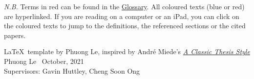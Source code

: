 \thispagestyle{empty}
\vspace*{5cm}
\Large
\textit{N.B.} Terms in red can be found in the \hyperref[glossary]{Glossary}. All coloured texts (blue or red) are hyperlinked. If you are reading on a computer or an iPad, you can click on the coloured texts to jump to the definitions, the referenced sections or the cited papers.

\vfill
\normalsize
\LaTeX\ template by 
Phuong Le, inspired by André Miede's \href{https://bitbucket.org/amiede/classicthesis/wiki/Home}{\textit{A Classic Thesis Style}} \\
Phuong Le \textcopyright\ October, 2021 \\
Supervisors: Gavin Huttley, Cheng Soon Ong

\newpage